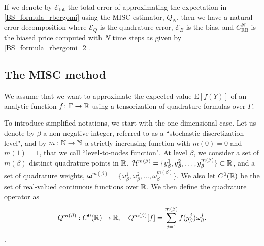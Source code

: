If we denote by $\mathcal{E}_{\text{tot}}$ the total error of approximating the  expectation in \eqref{BS_formula_rbergomi} using the MISC estimator, $Q_N$, then we have a natural error decomposition
where  $\mathcal{E}_Q$ is the quadrature error, $\mathcal{E}_B$  is the bias, and $C_{\text{RB}}^N$ is the biased price computed with $N$ time steps as given by \eqref{BS_formula_rbergomi_2}.

\subsection{The MISC method}\label{sec:Details of the MISC}

We assume that we want to approximate the expected value $\text{E}[f(Y)]$ of an analytic function $f\colon \Gamma \to \mathbb{R}$ using a tensorization of quadrature formulas over $\Gamma$.

To introduce simplified notations, we start with the one-dimensional case. Let us denote by $\beta$ a non-negative integer, referred to as a ``stochastic discretization level", and by $m: \mathbb{N} \rightarrow \mathbb{N}$  a strictly increasing function with $m(0)=0$ and $m(1)=1$, that we call  ``level-to-nodes function". At level $\beta$, we consider a set of $m(\beta)$ distinct quadrature points in $\mathbb{R}$, $\mathcal{H}^{m(\beta)}=\{y^1_\beta,y^2_\beta,\dots,y_\beta^{m(\beta)}\} \subset \mathbb{R}$, and a set of quadrature weights, $\boldsymbol{\omega}^{m(\beta)}=\{\omega^1_\beta,\omega^2_\beta,\dots,\omega_\beta^{m(\beta)}\}$. We also let $C^0(\mathbb{R})$ be the set of real-valued continuous functions over $\mathbb{R}$. We then define the quadrature operator as
\begin{equation*}
Q^{m(\beta)}:C^0(\mathbb{R}) \rightarrow \mathbb{R}, \quad Q^{m(\beta)}[f]= \sum_{j=1}^{m(\beta)} f(y^j_\beta) \omega_\beta^j.
\end{equation*}
.

